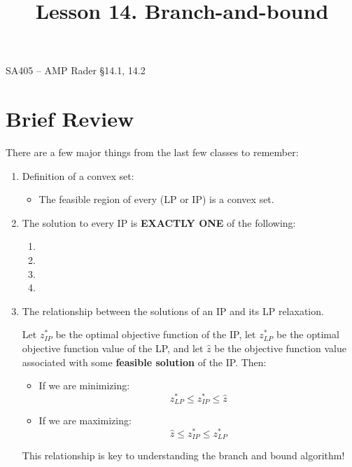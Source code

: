 \documentclass[11pt]{article}
\makeatletter
\theoremstyle{definition}
\renewcommand{\maketitle}{
  \noindent SA405 -- AMP \hfill Rader \S 14.1, 14.2  \\

  \begin{center}\Large{\textbf{\@title}}\end{center}
}
\makeatother
\begin{document}
  
\title{Lesson 14.  Branch-and-bound}

\maketitle

\section{Brief Review}

There are a few major things from the last few classes to remember:
	\begin{enumerate}
	\item Definition of a convex set: \vspace{2cm}
		\begin{itemize}
		\item The feasible region of every (LP or IP) is a convex set.
		\end{itemize}
		\vfill
	\item The solution to every IP is \textbf{EXACTLY ONE} of the following:
		\begin{enumerate}
		\item \phantom{1}
		\item \phantom{1}
		\item \phantom{1}
		\item \phantom{1}
		\end{enumerate}
		\vfill
	\item The relationship between the solutions of an IP and its LP relaxation.

\begin{tcolorbox}
Let $z^*_{IP}$ be the optimal objective function of the IP, let $z^*_{LP}$ be the optimal objective function value of the LP, and let $\hat{z}$ be the objective function value associated with some \textbf{feasible solution} of the IP. Then:
	\begin{itemize}
	\item If we are minimizing:
	\[
	z^*_{LP} \leq z^*_{IP} \leq \hat{z}
	\]
	\item If we are maximizing:
	\[
	\hat{z} \leq z^*_{IP} \leq z^*_{LP}
	\]
	\end{itemize}
\end{tcolorbox}	
This relationship is key to understanding the branch and bound algorithm!	
	\end{enumerate}

\newpage
\end{document}
